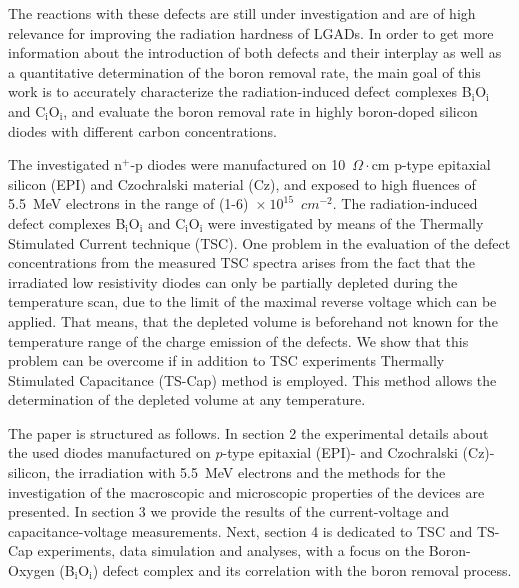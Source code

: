 \documentclass[final, 5p, times]{elsarticle}
\begin{document}
\par
The reactions with these defects are still under investigation and are of high relevance for improving the radiation hardness of LGADs. In order to get more information about the introduction of both defects and their interplay as well as a quantitative determination of the boron removal rate, the main goal of this work is to accurately characterize the radiation-induced defect complexes B$_\text{i}$O$_\text{i}$ and C$_\text{i}$O$_\text{i}$, and evaluate the boron removal rate in highly boron-doped silicon diodes with different carbon concentrations.
\par
The investigated n$^+$-p diodes were manufactured on 10~$\Omega \cdot$cm p-type epitaxial silicon (EPI) and Czochralski material (Cz), and exposed to high fluences of 5.5~MeV electrons in the range of (1-6)~$\times~10^{15}$~$\si{cm^{-2}}$. The radiation-induced defect complexes B$_\text{i}$O$_\text{i}$ and C$_\text{i}$O$_\text{i}$ were investigated by means of the Thermally Stimulated Current technique (TSC). One problem in the evaluation of the defect concentrations from the measured TSC spectra arises from the fact that the irradiated low resistivity diodes can only be partially depleted during the temperature scan, due to the limit of the maximal reverse voltage which can be applied. That means, that the depleted volume is beforehand not known for the temperature range of the charge emission of the defects. We show that this problem can be overcome if in addition to TSC experiments Thermally Stimulated Capacitance (TS-Cap) method is employed. This method allows the determination of the depleted volume at any temperature.
\par
The paper is structured as follows. In section 2 the experimental details about the used diodes manufactured on $p$-type epitaxial (EPI)- and Czochralski (Cz)-silicon, the irradiation with \SI{5.5}{\mega\electronvolt} electrons and the methods for the investigation of the macroscopic and microscopic properties of the devices are presented. In section 3 we provide the results of the current-voltage and capacitance-voltage measurements. Next, section 4 is dedicated to TSC and TS-Cap experiments, data simulation and analyses, with a focus on the Boron-Oxygen (B$_\text{i}$O$_\text{i}$) defect complex and its correlation with the boron removal process.
\end{document}

